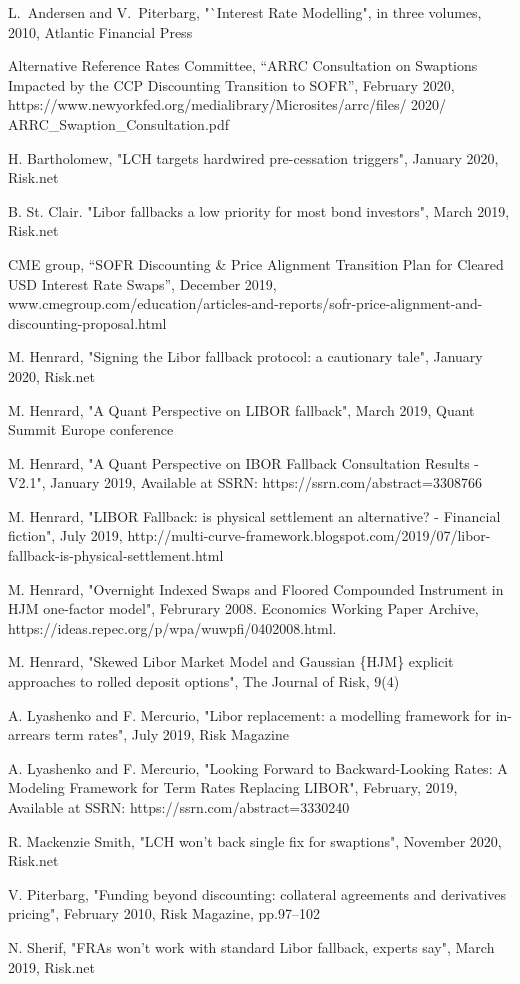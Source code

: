 \documentclass{article}
\begin{document}
\begin{thebibliography}{99}
 L.~Andersen and V.~Piterbarg, "`Interest Rate Modelling",
in three volumes, 2010, Atlantic Financial Press

 Alternative Reference Rates Committee, ``ARRC Consultation on
Swaptions Impacted by the CCP Discounting Transition to SOFR'', February
2020, https://www.newyorkfed.org/medialibrary/Microsites/arrc/files/ 2020/
ARRC\_Swaption\_Consultation.pdf

 H. Bartholomew, "LCH targets hardwired pre-cessation
triggers", January 2020, Risk.net

 B. St. Clair. "Libor fallbacks a low priority for most
bond investors", March 2019, Risk.net

 CME group, ``SOFR Discounting \& Price Alignment Transition
Plan for Cleared USD Interest Rate Swaps'', December 2019,
www.cmegroup.com/education/articles-and-reports/sofr-price-alignment-and-discounting-proposal.html

 M. Henrard, "Signing the Libor fallback protocol: a
cautionary tale", January 2020, Risk.net

 M. Henrard, "A Quant Perspective on LIBOR fallback",
March 2019, Quant Summit Europe conference

 M. Henrard, "A Quant Perspective on IBOR Fallback
Consultation Results - V2.1", January 2019, Available at SSRN:
https://ssrn.com/abstract=3308766

 M. Henrard, "LIBOR Fallback: is physical settlement
an alternative? - Financial fiction", July 2019,
http://multi-curve-framework.blogspot.com/2019/07/libor-fallback-is-physical-settlement.html

 M. Henrard, "Overnight Indexed Swaps and Floored
Compounded Instrument in HJM one-factor model", Februrary 2008. Economics
Working Paper Archive, https://ideas.repec.org/p/wpa/wuwpfi/0402008.html.

 M. Henrard, "Skewed Libor Market Model and Gaussian
\{HJM\} explicit approaches to rolled deposit options", The Journal of Risk,
9(4)

 A. Lyashenko and F. Mercurio, "Libor replacement: a
modelling framework for in-arrears term rates", July 2019, Risk Magazine

 A. Lyashenko and F. Mercurio, "Looking Forward to
Backward-Looking Rates: A Modeling Framework for Term Rates Replacing
LIBOR", February, 2019, Available at SSRN: https://ssrn.com/abstract=3330240

 R. Mackenzie Smith, "LCH won't back single fix for
swaptions", November 2020, Risk.net

 V. Piterbarg, "Funding beyond discounting: collateral
agreements and derivatives pricing", February 2010, Risk Magazine, pp.97--102

 N. Sherif, "FRAs won't work with standard Libor
fallback, experts say", March 2019, Risk.net
\end{thebibliography}
\end{document}
